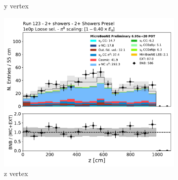 \begin{figure}[H]
\begin{subfigure}{0.3\textwidth}
    \caption{y vertex}
    \end{subfigure}
    \begin{subfigure}{0.3\textwidth}
    \includegraphics[width=1.0\textwidth]{Sidebands/Figures/TwoShr_1e0pSel/loose/reco_nu_vtx_z.pdf}
    \caption{z vertex}
    \end{subfigure}
    \caption{} 
    \label{fig:HE_1eNp_1}
\end{figure}

